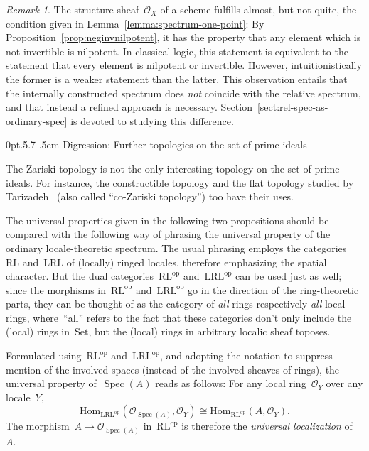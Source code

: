 \documentclass[10pt,reqno,a4paper]{amsbook}
\makeatletter
\theoremstyle{definition}
\theoremstyle{plain}
\theoremstyle{remark}
\newtheorem{rem}[defn]{Remark}
\renewcommand{\O}{\mathcal{O}}
\newcommand{\Hom}{\mathrm{Hom}}
\newcommand{\Set}{\mathrm{Set}}
\newcommand{\RL}{\mathrm{RL}}
\newcommand{\LRL}{\mathrm{LRL}}
\DeclareMathOperator{\Spec}{Spec}
\newcommand{\op}{\mathrm{op}}
\newcommand{\?}{\,{:}\,}
\renewcommand{\_}{\mathpunct{.}\,}
\def\subsection{\@startsection{subsection}{2}%
  {0pt}{.5\linespacing\@plus.7\linespacing}{-.5em}%
  {\normalfont\bfseries}}
\makeatother
\begin{document}
{\begin{rem}The structure sheaf~$\O_X$ of a scheme fulfills almost, but not
quite, the condition given in Lemma~\ref{lemma:spectrum-one-point}: By
Proposition~\ref{prop:neginvnilpotent}, it has the property that
any element which is not invertible is nilpotent. In classical logic, this
statement is equivalent to the statement that every element is nilpotent or invertible.
However, intuitionistically the former is a weaker statement than the latter.
This observation entails that the internally constructed spectrum does
\emph{not} coincide with the relative spectrum, and that instead a refined
approach is necessary. Section~\ref{sect:rel-spec-as-ordinary-spec} is devoted
to studying this difference.
\end{rem}

}


\subsection{Digression: Further topologies on the set of prime ideals}
\label{sect:flat-constructible-topologies}

The Zariski topology is not the only interesting topology on the set of prime
ideals. For instance, the constructible topology and the flat topology studied
by Tarizadeh~\cite{tarizadeh:flat} (also called ``co-Zariski topology'') too
have their uses.

The universal properties given in the following two propositions should be
compared with the following way of phrasing the universal property of the
ordinary locale-theoretic spectrum. The usual phrasing employs the
categories~$\RL$ and~$\LRL$ of (locally) ringed locales, therefore emphasizing
the spatial character. But the dual categories~$\RL^\op$ and~$\LRL^\op$ can be
used just as well; since the morphisms in~$\RL^\op$ and~$\LRL^\op$ go in the
direction of the ring-theoretic parts, they can be thought of as the category
of \emph{all} rings respectively \emph{all} local rings, where~``all'' refers
to the fact that these categories don't only include the (local) rings
in~$\Set$, but the (local) rings in arbitrary localic sheaf toposes.

Formulated using~$\RL^\op$ and~$\LRL^\op$, and adopting the notation to
suppress mention of the involved spaces (instead of the involved sheaves
of rings), the universal property of~$\Spec(A)$ reads as follows: For any
local ring~$\O_Y$ over any locale~$Y$,
\[ \Hom_{\LRL^\op}(\O_{\Spec(A)}, \O_Y) \cong
  \Hom_{\RL^\op}(A, \O_Y). \]
The morphism~$A \to \O_{\Spec(A)}$ in~$\RL^\op$ is therefore the
\emph{universal localization} of~$A$.
\end{document}
